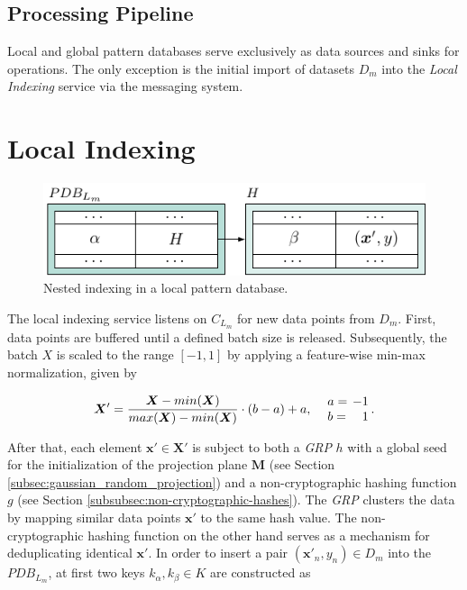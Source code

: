\subsection{Processing Pipeline} \label{subsec:processing_pipeline} 
Local and global pattern databases serve exclusively as data sources and sinks for operations. The only exception is the initial import of datasets $D_m$ into the \textit{Local Indexing} service via the messaging system.



\section{Local Indexing}

\begin{figure}[b]
    \centering
    \includegraphics[width=1\linewidth]{tikz/indexing.pdf}
    \caption{Nested indexing in a local pattern database.}
    \label{fig:indexing}
\end{figure}

The local indexing service listens on $C_{L_m}$ for new data points from $D_m$. First, data points are buffered until a defined batch size is released. Subsequently, the batch $X$ is scaled to the range $[-1, 1]$ by applying a feature-wise min-max normalization, given by

\begin{align*}
    \bm{X}' = \frac{\bm{X}-min(\bm{X})}{max(\bm{X}) - min(\bm{X})} \cdot (b - a) + a, \quad
    \setlength\arraycolsep{2pt}
    \begin{array}{lr}
        a = &-1 \\
        b = & 1    
    \end{array}.
\end{align*}

After that, each element $\bm{x}' \in \bm{X}'$ is subject to both a \textit{GRP} $h$ with a global seed for the initialization of the projection plane $\bm{M}$ (see Section \ref{subsec:gaussian_random_projection}) and a non-cryptographic hashing function $g$ (see Section \ref{subsubsec:non-cryptographic-hashes}). The \textit{GRP} clusters the data by mapping similar data points $\bm{x}'$ to the same hash value. The non-cryptographic hashing function on the other hand serves as a mechanism for deduplicating identical $\bm{x}'$. In order to insert a pair $(\bm{x}'_n, y_n) \in D_m$ into the $PDB_{L_m}$, at first two keys $k_\alpha, k_\beta \in K$ are constructed as

